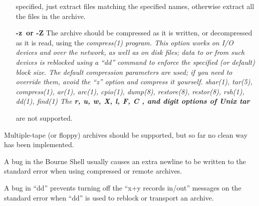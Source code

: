 \begin{itemize}
specified, just extract files matching the specified names, otherwise extract
all the files in the archive.
\item[{\bf -z\rm\ or \bf -Z\rm}]
The archive should be compressed as it is written, or decompressed as it
is read, using the %
\it compress(1) \rm%
 program.  This option works on I/O
devices and over the network, as well as on disk files; data to or from
such devices is reblocked using a ``dd'' command
to enforce the specified (or default) block size.  The default compression
parameters are used; if you need to override them, avoid the ``z'' option
and compress it yourself.
shar(1), tar(5), compress(1), ar(1), arc(1), cpio(1), dump(8), restore(8),
restor(8), rsh(1), dd(1), find(1)
The %
\bf r, u, w, X, l, F, C\rm%
, and %
\it digit \rm%
 options of Unix %
\it tar \rm%

are not supported.
\end{itemize}
Multiple-tape (or floppy) archives should be supported, but so far no
clean way has been implemented.
\par\noindent
A bug in the Bourne Shell usually causes an extra newline to be written
to the standard error when using compressed or remote archives.
\par\noindent
A bug in ``dd'' prevents turning off the ``x+y records in/out'' messages
on the standard error when ``dd'' is used to reblock or transport an archive.

